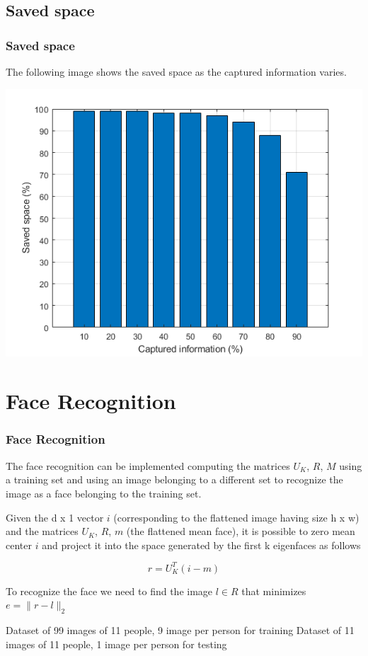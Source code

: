 \documentclass[10pt]{beamer}
\begin{document}
\subsection{Saved space}
\begin{frame}
    \frametitle{Saved space}
    The following image shows the saved space as the captured information varies.

    \begin{center}
        \includegraphics[scale=0.7]{space_used.png}    
    \end{center}
    
\end{frame}

\section{Face Recognition}
\begin{frame}
    \frametitle{Face Recognition}
    The face recognition can be implemented computing the matrices $ U_K $, $ R $, $ M $ using a training set and using an image belonging to a different set to recognize the image as a face belonging to the training set.
    
    Given the d x 1 vector $ i $ (corresponding to the flattened image having size h x w) and the matrices $ U_K $, $ R $, $ m $ (the flattened mean face), 
    it is possible to zero mean center $ i $ and project it into the space generated by the first k eigenfaces as follows
    
    \begin{equation}
        r = U_K^T (i - m)  
    \end{equation}

    To recognize the face we need to find the image $ l \in R $ that minimizes $ e = \lVert r - l \rVert_2 $ 

    Dataset of 99 images of 11 people, 9 image per person for training
    Dataset of 11 images of 11 people, 1 image per person for testing
\end{frame}
\end{document}

